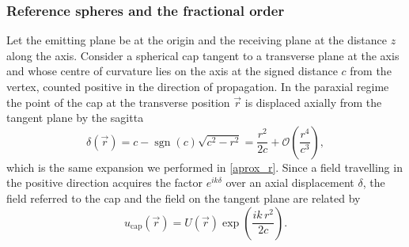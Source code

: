 		\subsubsection{Reference spheres and the fractional order}

			Let the emitting plane be at the origin and the receiving plane at the distance $z$ along the axis. Consider a spherical cap tangent to a transverse plane at the axis and whose centre of curvature lies on the axis at the signed distance $c$ from the vertex, counted positive in the direction of propagation. In the paraxial regime the point of the cap at the transverse position $\vec{r}$ is displaced axially from the tangent plane by the sagitta
			\begin{equation}\label{eq:FrFT:Sagitta}
				\delta(\vec{r}) = c - \operatorname{sgn}(c)\sqrt{c^{2}-r^{2}} = \frac{r^{2}}{2c} + \mathcal{O}\!\left(\frac{r^{4}}{c^{3}}\right),
			\end{equation}
			which is the same expansion we performed in \eqref{aprox_r}. Since a field travelling in the positive direction acquires the factor $e^{ik\delta}$ over an axial displacement $\delta$, the field referred to the cap and the field on the tangent plane are related by
			\begin{equation}\label{eq:FrFT:SphereRule}
				u_{\text{cap}}(\vec{r}) = U(\vec{r})\exp\left(\frac{ik\,r^{2}}{2c}\right).
			\end{equation}

